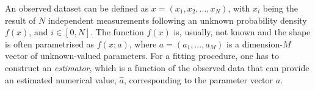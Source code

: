 An observed dataset can be defined as $x = (x_1, x_2,...,x_N)$, with $x_i$ being the result of $N$ independent measurements following an unknown probability density $f(x)$, and $i\in[0,N]$.
The function $f(x)$ is, usually, not known and the shape is often parametrised as $f(x; a)$, where $a=(a_1,...,a_M)$ is a dimension-$M$ vector of unknown-valued parameters. 
For a fitting procedure, one has to construct an \textit{estimator}, which is a function of the observed data that can provide an estimated numerical value, $\hat{a}$, corresponding to the parameter vector $a$.


